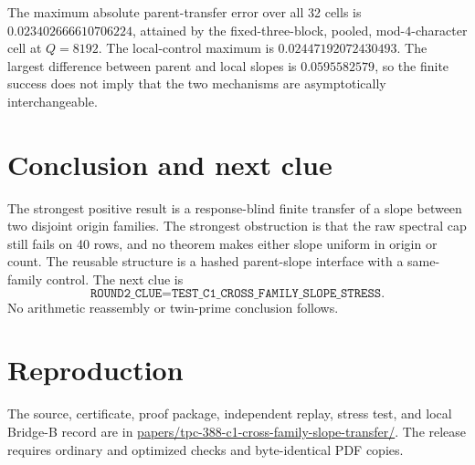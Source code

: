 \documentclass[10pt]{article}
\begin{document}
The maximum absolute parent-transfer error over all 32 cells is
$0.023402666610706224$, attained by the fixed-three-block, pooled,
mod-$4$-character cell at $Q=8192$.  The local-control maximum is
$0.02447192072430493$.  The largest difference between parent and local
slopes is $0.0595582579$, so the finite success does not imply that the two
mechanisms are asymptotically interchangeable.

\section{Conclusion and next clue}

The strongest positive result is a response-blind finite transfer of a slope
between two disjoint origin families.  The strongest obstruction is that the
raw spectral cap still fails on 40 rows, and no theorem makes either slope
uniform in origin or count.  The reusable structure is a hashed parent-slope
interface with a same-family control.  The next clue is
\[
 \texttt{ROUND2\_CLUE=TEST\_C1\_CROSS\_FAMILY\_SLOPE\_STRESS}.
\]
No arithmetic reassembly or twin-prime conclusion follows.

\section*{Reproduction}

The source, certificate, proof package, independent replay, stress test, and
local Bridge-B record are in
\url{papers/tpc-388-c1-cross-family-slope-transfer/}.  The release requires
ordinary and optimized checks and byte-identical PDF copies.
\end{document}

